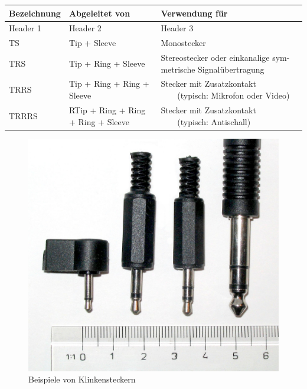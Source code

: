 \begin{longtable}{|p{}|p{}|p{}|}
\hline
\rowcolor{gray!50} Bezeichnung & Abgeleitet von & Verwendung für \\
\hline
\endfirsthead

\hline
Header 1 & Header 2 & Header 3 \\
\hline
\endhead

\hline
\endfoot

\hline
\endlastfoot

TS & Tip + Sleeve & Monostecker \\
\hline
TRS & Tip + Ring + Sleeve & Stereostecker oder einkanalige sym- metrische Signalübertragung \\
\hline
TRRS & Tip + Ring + Ring + Sleeve & Stecker mit Zusatzkontakt ~~~~(typisch: Mikrofon oder Video) \\
\hline
TRRRS & RTip + Ring + Ring + Ring + Sleeve & Stecker mit Zusatzkontakt ~~~~(typisch: Antischall) \\
\hline

\end{longtable}
\cite{dewiki:245747795}


\begin{figure}[h]
    \centering
    \includegraphics[width=1\textwidth]{Bilder/Medientechnik/Photo-audiojacks.jpg}
    \caption{Beispiele von Klinkensteckern}
    \label{fig:Klinkenstecker}
\end{figure}
\newpage

